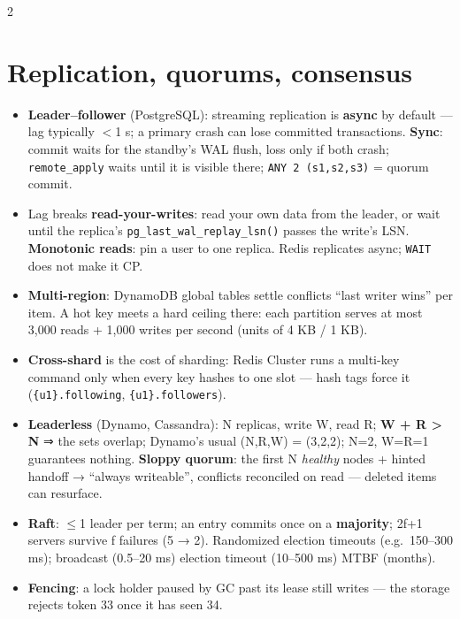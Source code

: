 \documentclass[8pt]{extarticle}
\newcommand\ct[1]{\texttt{#1}}
\begin{document}
\begin{multicols}{2}
\section{Replication, quorums, consensus}
\begin{itemize}
  \item \textbf{Leader–follower} (PostgreSQL): streaming replication is \textbf{async} by default —
        lag typically $<$1 s; a primary crash can lose committed transactions. \textbf{Sync}: commit
        waits for the standby's WAL flush, loss only if both crash; \ct{remote\_apply} waits until it
        is visible there; \ct{ANY 2 (s1,s2,s3)} = quorum commit.
  \item Lag breaks \textbf{read-your-writes}: read your own data from the leader, or wait until the
        replica's \ct{pg\_last\_wal\_replay\_lsn()} passes the write's LSN. \textbf{Monotonic reads}:
        pin a user to one replica. Redis replicates async; \ct{WAIT} does not make it CP.
  \item \textbf{Multi-region}: DynamoDB global tables settle conflicts ``last writer wins'' per item.
        A hot key meets a hard ceiling there: each partition serves at most 3,000 reads + 1,000
        writes per second (units of 4 KB / 1 KB).
  \item \textbf{Cross-shard} is the cost of sharding: Redis Cluster runs a multi-key command only
        when every key hashes to one slot — hash tags force it (\ct{\{u1\}.following},
        \ct{\{u1\}.followers}).
  \item \textbf{Leaderless} (Dynamo, Cassandra): N replicas, write W, read R; \textbf{W + R > N} ⇒ the
        sets overlap; Dynamo's usual (N,R,W) = (3,2,2); N=2, W=R=1 guarantees nothing.
        \textbf{Sloppy quorum}: the first N \emph{healthy} nodes + hinted handoff → ``always
        writeable'', conflicts reconciled on read — deleted items can resurface.
  \item \textbf{Raft}: $\leq$1 leader per term; an entry commits once on a \textbf{majority}; 2f+1
        servers survive f failures (5 → 2). Randomized election timeouts (e.g.\ 150–300 ms);
        broadcast (0.5–20 ms) \pdfonly{$\ll$} election timeout (10–500 ms)
        \pdfonly{$\ll$} MTBF (months).
  \item \textbf{Fencing}: a lock holder paused by GC past its lease still writes — the storage
        rejects token 33 once it has seen 34.
\end{itemize}


\end{multicols}
\end{document}
